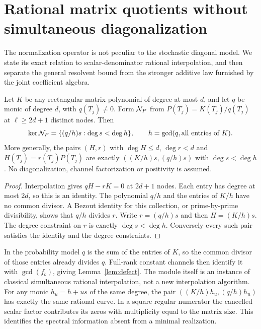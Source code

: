 \section{Rational matrix quotients without simultaneous diagonalization}
\label{sec:general-quotient}
The normalization operator is not peculiar to the stochastic diagonal
model. We state its exact relation to scalar-denominator rational
interpolation, and then separate the general resolvent bound from the
stronger additive law furnished by the joint coefficient algebra.

\begin{theorem}\label{thm:rational-module}
Let $K$ be any rectangular matrix polynomial of degree at most $d$,
and let $q$ be monic of degree $d$, with $q(T_j)\ne0$. Form $\mathcal N_P$
from $P(T_j)=K(T_j)/q(T_j)$ at $\ell\ge2d+1$ distinct nodes. Then
\begin{equation}\label{eq:general-gcd}
 \ker\mathcal N_P=\{(q/h)s:\deg s<\deg h\},\qquad
 h=\gcd(q,\hbox{all entries of }K).
\end{equation}
More generally, the pairs $(H,r)$ with $\deg H\le d$, $\deg r<d$ and
$H(T_j)=r(T_j)P(T_j)$ are exactly
$((K/h)s,(q/h)s)$ with $\deg s<\deg h$.
No diagonalization, channel factorization or positivity is assumed.
\end{theorem}
\begin{proof}
Interpolation gives $qH-rK=0$ at $2d+1$ nodes. Each entry has degree
at most $2d$, so this is an identity. The polynomial $q/h$ and the
entries of $K/h$ have no common divisor. A Bezout identity for this
collection, or prime-by-prime divisibility, shows that $q/h$ divides
$r$. Write $r=(q/h)s$ and then $H=(K/h)s$. The degree constraint on
$r$ is exactly $\deg s<\deg h$. Conversely every such pair satisfies
the identity and the degree constraints.
\end{proof}

In the probability model $q$ is the sum of the entries of $K$, so the
common divisor of those entries already divides $q$. Full-rank constant
channels then identify it with $\gcd(f_b)$, giving
Lemma~\ref{lem:defect}. The module itself is an instance of classical
simultaneous rational interpolation, not a new interpolation algorithm.
For any monic $h_u=h+us$ of the same degree, the pair
$((K/h)h_u,(q/h)h_u)$ has exactly the same rational curve. In a square
regular numerator the cancelled scalar factor contributes its zeros
with multiplicity equal to the matrix size. This identifies the
spectral information absent from a minimal realization.

